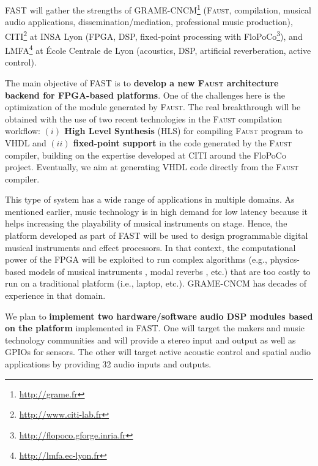 \documentclass[a4paper,9pt]{extarticle}
\newcommand{\F}{\textsc{Faust}}
\newcommand{\PP}{FAST}
\begin{document}
\PP{} will gather the strengths of GRAME-CNCM\footnote{\url{http://grame.fr}} (\F{}, compilation, musical audio applications, dissemination/mediation, professional music production), CITI\footnote{\url{http://www.citi-lab.fr}} at INSA Lyon (FPGA, DSP, fixed-point processing with FloPoCo\footnote{\url{http://flopoco.gforge.inria.fr}}), and LMFA\footnote{\url{http://lmfa.ec-lyon.fr}} at École Centrale de Lyon (acoustics, DSP, artificial reverberation, active control).

The main objective of \PP{} is to \textbf{develop a new \F{} architecture backend for FPGA-based platforms}. One of the challenges here is the optimization of the module generated by \F{}. The real breakthrough will be obtained with the use of two recent technologies in the \F{} compilation workflow: {\bf $(i)$ High Level Synthesis} (HLS) for compiling \F{} program to VHDL and {\bf $(ii)$ fixed-point support} in the code generated by the \F{} compiler, building on the expertise developed at CITI around the FloPoCo project. Eventually, we aim at generating VHDL code directly from the \F{} compiler. 

This type of system has a wide range of applications in multiple domains. As mentioned earlier, music technology is in high demand for low latency because it helps increasing the playability of musical instruments on stage. Hence, the platform developed as part of \PP{} will be used to design programmable digital musical instruments and effect processors. In that context, the computational power of the FPGA will be exploited to run complex algorithms (e.g., physics-based models of musical instruments \cite{Bilbao2009}, modal reverbs \cite{Abel2009}, etc.) that are too costly to run on a traditional platform (i.e., laptop, etc.). GRAME-CNCM has decades of experience in that domain. 

We plan to \textbf{implement two hardware/software audio DSP modules based on the platform} implemented in \PP{}. One will target the makers and music technology communities and will provide a stereo input and output as well as GPIOs for sensors. The other will target active acoustic control and spatial audio applications by providing 32 audio inputs and outputs.
\end{document}
